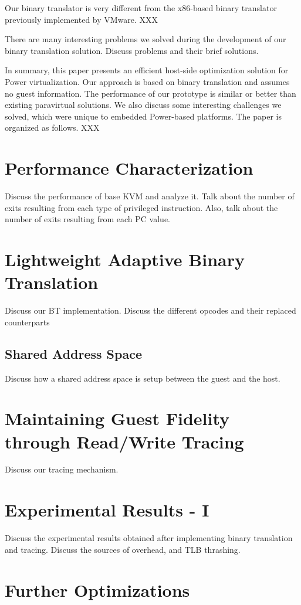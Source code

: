 \documentclass[10pt,twocolumn]{article}
\begin{document}
Our binary translator is very different from the x86-based binary translator
previously implemented by VMware. XXX

There are many interesting problems we solved during the development of our
binary translation solution. Discuss problems and their brief solutions.

In summary, this paper presents an efficient host-side optimization solution for
Power virtualization. Our approach is based on binary translation and assumes no
guest information. The performance of our prototype is similar or better than
existing paravirtual solutions. We also discuss some interesting challenges we solved,
which were unique to embedded Power-based platforms. The paper is organized as
follows. XXX

\section{Performance Characterization}
Discuss the performance of base KVM and analyze it. Talk about the number of exits
resulting from each type of privileged instruction. Also, talk about the number
of exits resulting from each PC value.

\section{Lightweight Adaptive Binary Translation}
Discuss our BT implementation. Discuss the different opcodes and their replaced
counterparts
\subsection{Shared Address Space}
Discuss how a shared address space is setup between the guest and the host.

\section{Maintaining Guest Fidelity through Read/Write Tracing}
Discuss our tracing mechanism.

\section{Experimental Results - I}
Discuss the experimental results obtained after implementing binary translation
and tracing. Discuss the sources of overhead, and TLB thrashing.

\section{Further Optimizations}
\end{document}
